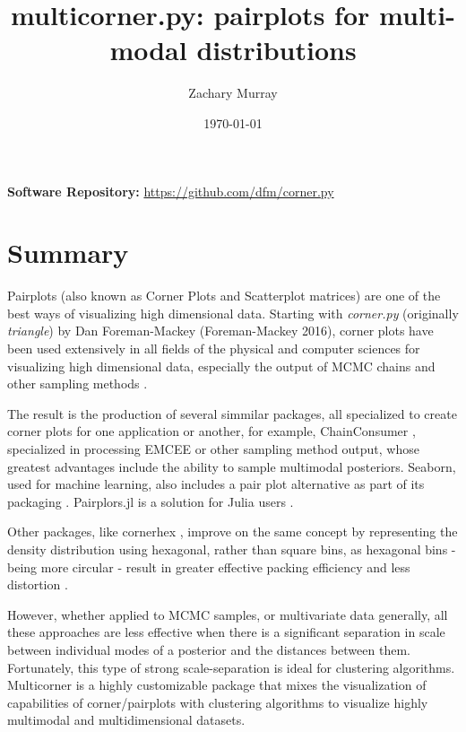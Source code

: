 \documentclass[]{article}
\title{multicorner.py: pairplots for multi-modal distributions}
\author{Zachary Murray}
\affil{Research Excellence Fellow, Université Côte d'Azur}
\date{\today}
\begin{document}
\maketitle

\textbf{Software Repository:} \url{https://github.com/dfm/corner.py}\\

\section{Summary}\label{summary}

Pairplots (also known as Corner Plots and Scatterplot matrices) are one of the best ways of visualizing high dimensional data.
Starting with \emph{corner.py} (originally \emph{triangle}) by Dan Foreman-Mackey (Foreman-Mackey 2016), corner plots have been used extensively in all fields of the physical and computer sciences for visualizing high dimensional data, especially the output of MCMC chains and other sampling methods \cite{corner}. 

The result is the production of several simmilar packages, all specialized to create corner plots for one application or another, for example, ChainConsumer \cite{Hinton2016}, specialized in processing EMCEE or other sampling method output, whose greatest advantages include the ability to sample multimodal posteriors. Seaborn, used for machine learning, also includes a pair plot alternative as part of its packaging \cite{seaborn}. Pairplors.jl is a solution for Julia users \cite{pairplotsjl}.

Other packages, like cornerhex \cite{cornerhex}, improve on the same concept by representing the density distribution using hexagonal, rather than square bins, as hexagonal bins - being more circular - result in greater effective packing efficiency and less distortion \cite{Carr_1987}. 

However, whether applied to MCMC samples, or multivariate data generally, all these approaches are less effective when there is a significant separation in scale between individual modes of a posterior and the distances between them.  Fortunately, this type of strong scale-separation is ideal for clustering algorithms. Multicorner is a highly customizable package that mixes the visualization of capabilities of corner/pairplots with clustering algorithms to visualize highly multimodal and multidimensional datasets.
\end{document}
